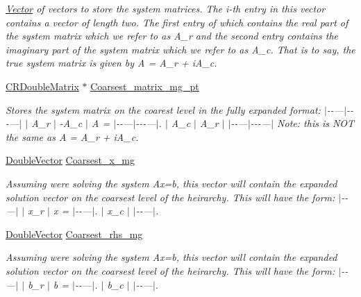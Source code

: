 \begin{DoxyCompactItemize}
\begin{DoxyCompactList}\small\item\em \hyperlink{classoomph_1_1Vector}{Vector} of vectors to store the system matrices. The i-\/th entry in this vector contains a vector of length two. The first entry of which contains the real part of the system matrix which we refer to as A\+\_\+r and the second entry contains the imaginary part of the system matrix which we refer to as A\+\_\+c. That is to say, the true system matrix is given by A = A\+\_\+r + i\+A\+\_\+c. \end{DoxyCompactList}\item 
\hyperlink{classoomph_1_1CRDoubleMatrix}{C\+R\+Double\+Matrix} $\ast$ \hyperlink{classoomph_1_1HelmholtzMGPreconditioner_a3258a6f09f4c4378cd6619f194e5d24b}{Coarsest\+\_\+matrix\+\_\+mg\+\_\+pt}
\begin{DoxyCompactList}\small\item\em Stores the system matrix on the coarest level in the fully expanded format\+: $\vert$-\/-\/---$\vert$-\/-\/-\/---$\vert$ $\vert$ A\+\_\+r $\vert$ -\/\+A\+\_\+c $\vert$ A = $\vert$-\/-\/---$\vert$-\/-\/-\/---$\vert$. $\vert$ A\+\_\+c $\vert$ A\+\_\+r $\vert$ $\vert$-\/-\/---$\vert$-\/-\/-\/---$\vert$ Note\+: this is N\+OT the same as A = A\+\_\+r + i\+A\+\_\+c. \end{DoxyCompactList}\item 
\hyperlink{classoomph_1_1DoubleVector}{Double\+Vector} \hyperlink{classoomph_1_1HelmholtzMGPreconditioner_a931536210d5862f28bd7f84f1c880b8a}{Coarsest\+\_\+x\+\_\+mg}
\begin{DoxyCompactList}\small\item\em Assuming we\textquotesingle{}re solving the system Ax=b, this vector will contain the expanded solution vector on the coarsest level of the heirarchy. This will have the form\+: $\vert$-\/-\/---$\vert$ $\vert$ x\+\_\+r $\vert$ x = $\vert$-\/-\/---$\vert$. $\vert$ x\+\_\+c $\vert$ $\vert$-\/-\/---$\vert$. \end{DoxyCompactList}\item 
\hyperlink{classoomph_1_1DoubleVector}{Double\+Vector} \hyperlink{classoomph_1_1HelmholtzMGPreconditioner_a592d08dd3b84f6818ba18913d72c3a1c}{Coarsest\+\_\+rhs\+\_\+mg}
\begin{DoxyCompactList}\small\item\em Assuming we\textquotesingle{}re solving the system Ax=b, this vector will contain the expanded solution vector on the coarsest level of the heirarchy. This will have the form\+: $\vert$-\/-\/---$\vert$ $\vert$ b\+\_\+r $\vert$ b = $\vert$-\/-\/---$\vert$. $\vert$ b\+\_\+c $\vert$ $\vert$-\/-\/---$\vert$. \end{DoxyCompactList}\item 

\end{DoxyCompactItemize}
